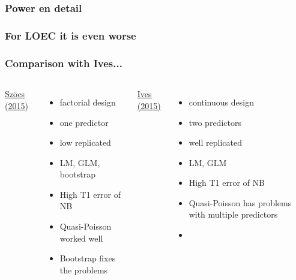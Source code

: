 \documentclass[10pt
	]{beamer}
\begin{document}
\appendix

\begin{frame}
\frametitle{Power en detail}
	\begin{adjustbox}{max totalsize={\textwidth}{\textheight}}
				
	\end{adjustbox}
\end{frame}


\begin{frame}
\frametitle{For LOEC it is even worse}
	\begin{adjustbox}{max totalsize={\textwidth}{\textheight}}
				
	\end{adjustbox}
\end{frame}


\begin{frame}
\frametitle{Comparison with Ives...}
	\begin{columns}
	    	\underline{Szöcs (2015)}
	    	\begin{itemize}
	        	\item factorial design
	        	\item one predictor
	        	\item low replicated
	        	\item LM, GLM, bootstrap
	        	\item High T1 error of NB
	        	\item Quasi-Poisson worked well \vspace{1.2em}
	        	\item Bootstrap fixes the problems
	        \end{itemize}
	    	\underline{Ives (2015)}
	        \begin{itemize}
	        	\item continuous design
	        	\item two predictors
	        	\item well replicated
	        	\item LM, GLM
	        	\item High T1 error of NB
	        	\item Quasi-Poisson has problems with multiple predictors
	        	\item
	        \end{itemize}
	\end{columns}
\end{frame}
\end{document}
